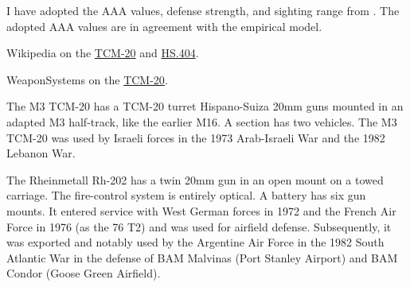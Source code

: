 \begin{withcounters}
{        I have adopted the AAA values, defense strength, and sighting range from {\EOTG}.
        The adopted AAA values are in agreement with the empirical model.

        \begin{notesources}
            \item Wikipedia on the \href{https://en.wikipedia.org/wiki/M45_quad_mount\#TCM-20}{TCM-20} and \href{https://en.wikipedia.org/wiki/Hispano-Suiza_HS.404}{HS.404}.
            \item WeaponSystems on the \href{https://weaponsystems.net/system/750-TCM-20}{TCM-20}.
        \end{notesources}
    }


    The M3 TCM-20 has a TCM-20 turret Hispano-Suiza 20mm guns mounted in an adapted M3 half-track, like the earlier M16. A section has two vehicles.
    The M3 TCM-20 was used by Israeli forces in the 1973 Arab-Israeli War and the 1982 Lebanon War.%


    The Rheinmetall Rh-202 has a twin 20mm gun in an open mount on a towed carriage. The fire-control system is entirely optical.
    A battery has six gun mounts.
    It entered service with West German forces in 1972 and the French Air Force in 1976 (as the 76 T2) and was used for airfield defense. Subsequently, it was exported and notably used by the Argentine Air Force in the 1982 South Atlantic War in the defense of BAM Malvinas (Port Stanley Airport) and BAM Condor (Goose Green Airfield).%
\end{withcounters}
